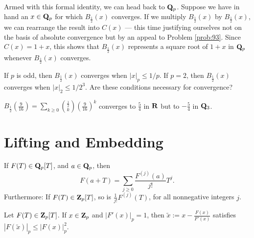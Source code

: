 Armed with this formal identity, we can head back to $\mathbf{Q}_p$. Suppose we have in hand an $x\in \mathbf{Q}_p$ for which $B_{\frac12}(x)$ converges. If we multiply $B_{\frac12}(x)$ by $B_{\frac12}(x)$, we can rearrange the result into $C(x)$ --- this time justifying ourselves not on the basis of absolute convergence but by an appeal to Problem \ref{prob:93}. Since $C(x)=1+x$, this shows that $B_{\frac{1}{2}}(x)$ represents a square root of $1+x$ in $\mathbf{Q}_p$ whenever $B_{\frac{1}{2}}(x)$ converges.

\begin{prob}\label{prob:F12convergence} If $p$ is odd, then $B_{\frac12}(x)$ converges when $|x|_p \le 1/p$. If $p=2$, then $B_{\frac12}(x)$ converges when $|x|_2 \le 1/2^3$. Are these conditions necessary for convergence?
\end{prob}

\begin{prob}\label{prob:differentroots} $B_{\frac12}(\frac{9}{16}) = \sum_{k\ge 0} \binom{\frac12}{k} (\frac{9}{16})^{k}$ converges to $\frac54$ in $\mathbf{R}$ but to $-\frac54$ in $\mathbf{Q}_3$.\end{prob}








\section*{Lifting and Embedding}

\begin{prob}\label{prob:113} If $F(T) \in \mathbf{Q}_p[T]$, and $a \in \mathbf{Q}_p$, then 
\[ F(a+T) = \sum_{j\ge 0} \frac{F^{(j)}{(a)}}{j!} T^j. \]
Furthermore: If $F(T) \in \mathbf{Z}_p[T]$, so is $\frac{1}{j!} F^{(j)}(T)$, for all nonnegative integers $j$.
\end{prob}

\begin{prob}\label{prob:114} Let $F(T) \in \mathbf{Z}_p[T]$.  If $x \in \mathbf{Z}_p$ and $|F'(x)|_p=1$, then $\tilde{x} := x- \frac{F(x)}{F'(x)}$ satisfies $|F(\tilde{x})|_p \le |F(x)|_p^2$.
\end{prob}
 

